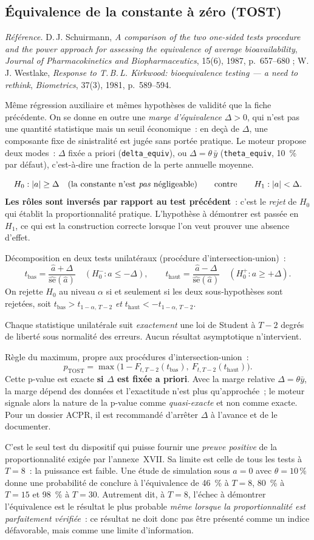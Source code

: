 \documentclass[a4paper,11pt]{article}
\newcommand{\code}[1]{\texttt{\small #1}}
\newcommand{\refl}[1]{{\small\textcolor{maincolor!70!black}{\textit{Référence.} #1}}\par\smallskip}
\newcounter{ficheid}
\newenvironment{fiche}[1]{%
  \stepcounter{ficheid}%
  \phantomsection
  \subsection{#1}%
  \label{fiche:\theficheid}%
}{%
  \end{description}\vspace{0.5em}%
}
\newcommand{\Cadre}{%
  \begin{description}[leftmargin=0pt, style=unboxed, itemsep=3pt, topsep=3pt, parsep=2pt]%
  \item[\textcolor{financeblue}{\textbf{1. Cadre, notations et hypothèses de validité (non testées).}}]}
\newcommand{\Hzero}{\item[\textcolor{financeblue}{\textbf{2. Hypothèse nulle.}}]}
\newcommand{\Stat}{\item[\textcolor{financeblue}{\textbf{3. Statistique de test.}}]}
\newcommand{\Loi}{\item[\textcolor{financeblue}{\textbf{4. Loi sous $H_0$.}}]}
\newcommand{\Pval}{\item[\textcolor{financeblue}{\textbf{5. p-value.}}]}
\newcommand{\Usage}{\item[\textcolor{financeblue}{\textbf{6. Usage et limites.}}]}
\begin{document}
\begin{fiche}{Équivalence de la constante à zéro (TOST)}
\refl{D.\,J. Schuirmann, \emph{A comparison of the two one-sided tests procedure and the power
approach for assessing the equivalence of average bioavailability}, \emph{Journal of
Pharmacokinetics and Biopharmaceutics}, 15(6), 1987, p.~657--680 ; W.\,J. Westlake,
\emph{Response to T.\,B.\,L. Kirkwood: bioequivalence testing --- a need to rethink},
\emph{Biometrics}, 37(3), 1981, p.~589--594.}
\Cadre
Même régression auxiliaire et mêmes hypothèses de validité que la fiche précédente. On se donne
en outre une \emph{marge d'équivalence} $\Delta > 0$, qui n'est pas une quantité statistique mais
un seuil économique~: en deçà de $\Delta$, une composante fixe de sinistralité est jugée sans
portée pratique. Le moteur propose deux modes~: $\Delta$ fixée a priori
(\code{delta\_equiv}), ou $\Delta = \theta\,\bar y$ (\code{theta\_equiv}, 10~\% par défaut),
c'est-à-dire une fraction de la perte annuelle moyenne.
\Hzero
\[
  H_0 : |a| \ge \Delta \quad\text{(la constante n'est \emph{pas} négligeable)}
  \qquad\text{contre}\qquad
  H_1 : |a| < \Delta .
\]
\textbf{Les rôles sont inversés par rapport au test précédent}~: c'est le \emph{rejet} de $H_0$
qui établit la proportionnalité pratique. L'hypothèse à démontrer est passée en $H_1$, ce qui est
la construction correcte lorsque l'on veut prouver une absence d'effet.
\Stat
Décomposition en deux tests unilatéraux (procédure d'intersection-union)~:
\[
  t_{\text{bas}} = \frac{\hat a + \Delta}{\widehat{\mathrm{se}}(\hat a)}
  \quad (H_0^{-} : a \le -\Delta),
  \qquad
  t_{\text{haut}} = \frac{\hat a - \Delta}{\widehat{\mathrm{se}}(\hat a)}
  \quad (H_0^{+} : a \ge +\Delta).
\]
On rejette $H_0$ au niveau $\alpha$ si et seulement si les deux sous-hypothèses sont rejetées,
soit $t_{\text{bas}} > t_{1-\alpha,\,T-2}$ \emph{et} $t_{\text{haut}} < -t_{1-\alpha,\,T-2}$.
\Loi
Chaque statistique unilatérale suit \emph{exactement} une loi de Student à $T-2$ degrés de
liberté sous normalité des erreurs. Aucun résultat asymptotique n'intervient.
\Pval
Règle du maximum, propre aux procédures d'intersection-union~:
\[
  p_{\text{TOST}} = \max\Big(1 - F_{t,T-2}(t_{\text{bas}}),\ F_{t,T-2}(t_{\text{haut}})\Big).
\]
Cette p-value est exacte \textbf{si $\Delta$ est fixée a priori}. Avec la marge relative
$\Delta = \theta\bar y$, la marge dépend des données et l'exactitude n'est plus qu'approchée~; le
moteur signale alors la nature de la p-value comme \emph{quasi-exacte} et non comme exacte. Pour
un dossier ACPR, il est recommandé d'arrêter $\Delta$ à l'avance et de le documenter.
\Usage
C'est le seul test du dispositif qui puisse fournir une \emph{preuve positive} de la
proportionnalité exigée par l'annexe~XVII. Sa limite est celle de tous les tests à $T = 8$~: la
puissance est faible. Une étude de simulation sous $a = 0$ avec $\theta = 10\,\%$ donne une
probabilité de conclure à l'équivalence de 46~\% à $T = 8$, 80~\% à $T = 15$ et 98~\% à
$T = 30$. Autrement dit, à $T = 8$, l'échec à démontrer l'équivalence est le résultat le plus
probable \emph{même lorsque la proportionnalité est parfaitement vérifiée}~: ce résultat ne doit
donc pas être présenté comme un indice défavorable, mais comme une limite d'information.


\end{fiche}
\end{document}
